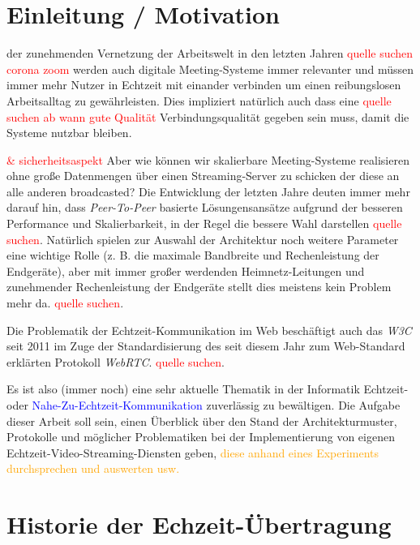 \documentclass{IEEEtran}
\begin{document}
\begin{twocolumn}

\section{Einleitung / Motivation}

 der zunehmenden Vernetzung der Arbeitswelt
in den letzten Jahren \textcolor{red}{quelle suchen corona zoom} werden auch
digitale Meeting-Systeme immer relevanter und müssen immer mehr Nutzer in
Echtzeit mit einander verbinden um einen reibungslosen Arbeitsalltag zu
gewährleisten. Dies impliziert natürlich auch dass eine \textcolor{red}{quelle
suchen ab wann gute Qualität} Verbindungsqualität gegeben sein muss, damit die
Systeme nutzbar bleiben.

\textcolor{red}{\& sicherheitsaspekt}
Aber wie können wir skalierbare Meeting-Systeme realisieren ohne große
Datenmengen über einen Streaming-Server zu schicken der diese an alle anderen
broadcasted? Die Entwicklung der letzten Jahre deuten immer mehr darauf hin,
dass \textit{Peer-To-Peer} basierte Lösungensansätze aufgrund der besseren
Performance und Skalierbarkeit, in der Regel die bessere Wahl darstellen
\textcolor{red}{quelle suchen}. Natürlich spielen zur Auswahl der Architektur
noch weitere Parameter eine wichtige Rolle (z. B. die maximale Bandbreite und
Rechenleistung der Endgeräte), aber mit immer großer werdenden
Heimnetz-Leitungen und zunehmender Rechenleistung der Endgeräte stellt dies
meistens kein Problem mehr da. \textcolor{red}{quelle suchen}.

Die Problematik der Echtzeit-Kommunikation im Web beschäftigt auch
das \textit{W3C} seit 2011 im Zuge der Standardisierung des seit diesem Jahr
zum Web-Standard erklärten Protokoll \textit{WebRTC}. \textcolor{red}{quelle
suchen}.

Es ist also (immer noch) eine sehr aktuelle Thematik in der Informatik
Echtzeit- oder \textcolor{blue}{Nahe-Zu-Echtzeit-Kommunikation} zuverlässig zu
bewältigen. Die Aufgabe dieser Arbeit soll sein, einen Überblick über den
Stand der Architekturmuster, Protokolle und möglicher Problematiken bei der
Implementierung von eigenen Echtzeit-Video-Streaming-Diensten geben,
\textcolor{orange}{diese anhand eines Experiments durchsprechen und auswerten
usw.}

\section{Historie der Echzeit-Übertragung}


\end{twocolumn}
\end{document}
